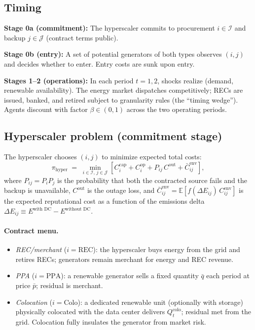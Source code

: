 \documentclass[a4paper,fleqn,longmktitle]{cas-sc}
\begin{document}
\subsection{Timing}

\textbf{Stage 0a (commitment):} The hyperscaler commits to procurement $i\in\mathcal I$ and backup $j\in\mathcal J$ (contract terms public).

\textbf{Stage 0b (entry):} A set of potential generators of both types observes $(i,j)$ and decides whether to enter. Entry costs are sunk upon entry.

\textbf{Stages 1--2 (operations):} In each period $t=1,2$, shocks realize (demand, renewable availability). The energy market dispatches competitively; RECs are issued, banked, and retired subject to granularity rules (the ``timing wedge''). Agents discount with factor $\beta\in(0,1)$ across the two operating periods.

\subsection{Hyperscaler problem (commitment stage)}

The hyperscaler chooses $(i,j)$ to minimize expected total costs:
\begin{equation}
\label{eq:hyper_obj}
\pi_{\text{hyper}} \;=\; \min_{i\in\mathcal I,\, j\in\mathcal J}
\left[
C^{\mathrm{cap}}_i + C^{\mathrm{op}}_i
+ P_{ij}\,C^{\mathrm{out}} + \bar C^{\mathrm{env}}_{ij}
\right],
\end{equation}
where $P_{ij}=P_i P_j$ is the probability that both the contracted source fails and the backup is unavailable, $C^{\mathrm{out}}$ is the outage loss, and $\bar C^{\mathrm{env}}_{ij}=\mathbb{E}[f(\Delta E_{ij})\,C^{\mathrm{env}}_{ij}]$ is the expected reputational cost as a function of the emissions delta $\Delta E_{ij}\equiv E^{\text{with DC}}-E^{\text{without DC}}$.

\paragraph{Contract menu.}
\begin{itemize}
\item \emph{REC/merchant} ($i=\text{REC}$): the hyperscaler buys energy from the grid and retires RECs; generators remain merchant for energy and REC revenue.
\item \emph{PPA} ($i=\text{PPA}$): a renewable generator sells a fixed quantity $\bar q$ each period at price $\bar p$; residual is merchant.
\item \emph{Colocation} ($i=\text{Colo}$): a dedicated renewable unit (optionally with storage) physically colocated with the data center delivers $Q^{\text{colo}}_t$; residual met from the grid. Colocation fully insulates the generator from market risk.
\end{itemize}
\end{document}
